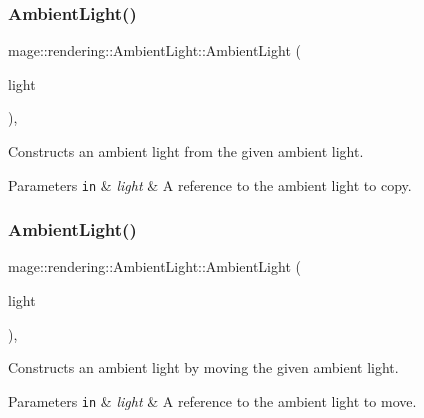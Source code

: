 \subsubsection{\texorpdfstring{Ambient\+Light()}{AmbientLight()}\hspace{0.1cm}{\footnotesize\ttfamily [2/3]}}
{\footnotesize\ttfamily mage\+::rendering\+::\+Ambient\+Light\+::\+Ambient\+Light (\begin{DoxyParamCaption}\item[{const \hyperlink{classmage_1_1rendering_1_1_ambient_light}{Ambient\+Light} \&}]{light }\end{DoxyParamCaption})\hspace{0.3cm}{\ttfamily [default]}, {\ttfamily [noexcept]}}

Constructs an ambient light from the given ambient light.


\begin{DoxyParams}[1]{Parameters}
\mbox{\tt in}  & {\em light} & A reference to the ambient light to copy. \\
\hline
\end{DoxyParams}
\hypertarget{classmage_1_1rendering_1_1_ambient_light_a8bd09baed470ce2c09af6a9893549937}{}\label{classmage_1_1rendering_1_1_ambient_light_a8bd09baed470ce2c09af6a9893549937} 
\subsubsection{\texorpdfstring{Ambient\+Light()}{AmbientLight()}\hspace{0.1cm}{\footnotesize\ttfamily [3/3]}}
{\footnotesize\ttfamily mage\+::rendering\+::\+Ambient\+Light\+::\+Ambient\+Light (\begin{DoxyParamCaption}\item[{\hyperlink{classmage_1_1rendering_1_1_ambient_light}{Ambient\+Light} \&\&}]{light }\end{DoxyParamCaption})\hspace{0.3cm}{\ttfamily [default]}, {\ttfamily [noexcept]}}

Constructs an ambient light by moving the given ambient light.


\begin{DoxyParams}[1]{Parameters}
\mbox{\tt in}  & {\em light} & A reference to the ambient light to move. \\
\hline
\end{DoxyParams}
\hypertarget{classmage_1_1rendering_1_1_ambient_light_a811cb86e80188b924085674a88a0bf7b}{}\label{classmage_1_1rendering_1_1_ambient_light_a811cb86e80188b924085674a88a0bf7b} 
